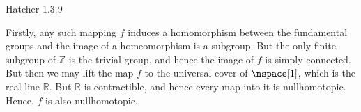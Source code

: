 \documentclass{article}                                                        %
\begin{document}
    \begin{problem}
        Hatcher 1.3.9
    \end{problem}
    \begin{solution}
        Firstly, any such mapping $f$ induces a homomorphism between the
        fundamental groups and the image of a homeomorphism is a subgroup. But
        the only finite subgroup of $\mathbb{Z}$ is the trivial group, and hence
        the image of $f$ is simply connected. But then we may lift the map $f$
        to the universal cover of $\nspace[1]$, which is the real line
        $\mathbb{R}$. But $\mathbb{R}$ is contractible, and hence every map into
        it is nullhomotopic. Hence, $f$ is also nullhomotopic.
    \end{solution}
\end{document}
